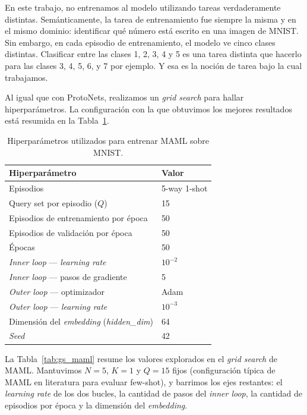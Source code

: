 \documentclass[12pt]{article}
\begin{document}
En este trabajo, no entrenamos al modelo utilizando tareas verdaderamente distintas. Semánticamente, la tarea de entrenamiento fue siempre la misma y en el mismo dominio: identificar qué número está escrito en una imagen de MNIST. Sin embargo, en cada episodio de entrenamiento, el modelo ve cinco clases distintas. Clasificar entre las clases 1, 2, 3, 4 y 5 es una tarea distinta que hacerlo para las clases 3, 4, 5, 6, y 7 por ejemplo. Y esa es la noción de tarea bajo la cual trabajamos.

Al igual que con ProtoNets, realizamos un \textit{grid search} para hallar hiperparámetros. La configuración con la que obtuvimos los mejores resultados está resumida en la Tabla~\ref{tab:hp_maml}.

\begin{table}[h]
    \centering
    \begin{tabular}{ll}
        \hline
        Hiperparámetro                       & Valor          \\
        \hline
        Episodios                            & 5-way 1-shot   \\
        Query set por episodio ($Q$)         & 15             \\
        Episodios de entrenamiento por época & 50             \\
        Episodios de validación por época    & 50             \\
        Épocas                               & 50             \\
        \textit{Inner loop} — \textit{learning rate}    & $10^{-2}$ \\
        \textit{Inner loop} — pasos de gradiente        & 5         \\
        \textit{Outer loop} — optimizador               & Adam      \\
        \textit{Outer loop} — \textit{learning rate}    & $10^{-3}$ \\
        Dimensión del \textit{embedding} (\textit{hidden\_dim}) & 64 \\
        \textit{Seed}                        & 42             \\
        \hline
    \end{tabular}
    \caption{Hiperparámetros utilizados para entrenar MAML sobre MNIST.}
    \label{tab:hp_maml}
\end{table}

La Tabla~\ref{tab:gs_maml} resume los valores explorados en el \textit{grid search} de MAML. Mantuvimos $N=5$, $K=1$ y $Q=15$ fijos (configuración típica de MAML en literatura para evaluar few-shot), y barrimos los ejes restantes: el \textit{learning rate} de los dos bucles, la cantidad de pasos del \textit{inner loop}, la cantidad de episodios por época y la dimensión del \textit{embedding}.
\end{document}
